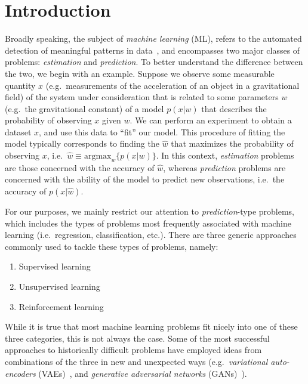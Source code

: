\documentclass[../main.tex]{subfiles}
\begin{document}
\section{Introduction}

Broadly speaking, the subject of \emph{machine learning} (ML), refers to the
automated detection of meaningful patterns in
data~\cite{shalev2014understanding}, and encompasses two major classes of
problems: \emph{estimation} and \emph{prediction}. 
%
%
To better understand the difference between the two, we begin with an example.
%
Suppose we observe some measurable quantity $x$ (e.g.\ measurements of the
acceleration of an object in a gravitational field) of the system under
consideration that is related to some parameters $w$ (e.g.\ the gravitational
constant) of a model $p (x | w)$ that describes the probability of observing
$x$ given $w$.
%
We can perform an experiment to obtain a dataset $x$, and use this data to
``fit'' our model. This procedure of fitting the model typically corresponds to
finding the $\hat w$ that maximizes the probability of observing $x$, i.e.\
$\hat{w} \equiv \mathrm{argmax}_{w} \{p (x|w)\}$.
%
In this context, \emph{estimation} problems are those concerned with the
accuracy of $\hat{w}$, whereas \emph{prediction} problems are concerned with
the ability of the model to predict new observations, i.e.\ the accuracy of $p
(x|\hat{w})$.

For our purposes, we mainly restrict our attention to \emph{prediction}-type
problems, which includes the types of problems most frequently associated with
machine learning (i.e.\ regression, classification, etc.).
There are three generic approaches commonly used to tackle these types of
problems, namely: 

%
\begin{enumerate}
  \item Supervised learning
  \item Unsupervised learning
  \item Reinforcement learning
\end{enumerate}
%
While it is true that most machine learning problems fit nicely into one of
these three categories, this is not always the case.
%
Some of the most successful approaches to historically difficult problems have
employed ideas from combinations of the three in new and unexpected ways (e.g.\
\emph{variational auto-encoders} (VAEs)~\cite{kingma2013auto}, and
\emph{generative adversarial networks} (GANs)~\cite{goodfellow2014generative}).
\end{document}
